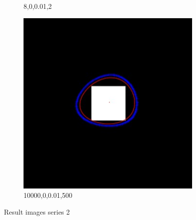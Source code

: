 \documentclass[paper=a4, fontsize=11pt]{scrartcl} %
\numberwithin{equation}{section} %
\numberwithin{figure}{section} %
\numberwithin{table}{section} %
\begin{document}
\begin{figure}[H]
\begin{subfigure}[b]{0.2\textwidth}
                \caption{8,0,0.01,2}
                \label{fig:Blacksquare7}
        \end{subfigure}
         \begin{subfigure}[b]{0.2\textwidth}
                \includegraphics[width=\textwidth]{123}
                \caption{10000,0,0.01,500}
                \label{fig:Blacksquare8}
        \end{subfigure}
        \caption{Result images series 2}\label{fig:animals}
\end{figure}
\end{document}
